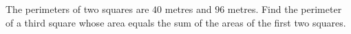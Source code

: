 The perimeters of two squares are $40$ metres and $96$ metres. Find the perimeter of a third square whose area equals the sum of the areas of the first two squares.
